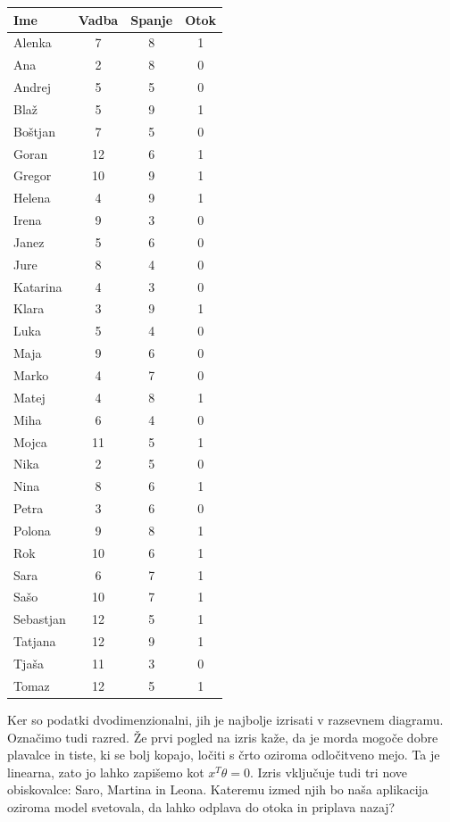 \begin{marginfigure}
\caption{Primer klasifikacijskih podatkov z meta atributum, neodvisnima spremenljivkama in razredom (Otok).}
\label{tab:bled}
\footnotesize
\centering
\begin{tabular}{lccc}
\toprule
Ime & Vadba & Spanje & Otok \\
\midrule
Alenka     & 7  & 8 & 1 \\
Ana        & 2  & 8 & 0 \\
Andrej     & 5  & 5 & 0 \\
Blaž       & 5  & 9 & 1 \\
Boštjan    & 7  & 5 & 0 \\
Goran      & 12 & 6 & 1 \\
Gregor     & 10 & 9 & 1 \\
Helena     & 4  & 9 & 1 \\
Irena      & 9  & 3 & 0 \\
Janez      & 5  & 6 & 0 \\
Jure       & 8  & 4 & 0 \\
Katarina   & 4  & 3 & 0 \\
Klara      & 3  & 9 & 1 \\
Luka       & 5  & 4 & 0 \\
Maja       & 9  & 6 & 0 \\
Marko      & 4  & 7 & 0 \\
Matej      & 4  & 8 & 1 \\
Miha       & 6  & 4 & 0 \\
Mojca      & 11 & 5 & 1 \\
Nika       & 2  & 5 & 0 \\
Nina       & 8  & 6 & 1 \\
Petra      & 3  & 6 & 0 \\
Polona     & 9  & 8 & 1 \\
Rok        & 10 & 6 & 1 \\
Sara       & 6  & 7 & 1 \\
Sašo       & 10 & 7 & 1 \\
Sebastjan  & 12 & 5 & 1 \\
Tatjana    & 12 & 9 & 1 \\
Tjaša      & 11 & 3 & 0 \\
Tomaz      & 12 & 5 & 1 \\
\bottomrule
\end{tabular}
\end{marginfigure}

Ker so podatki dvodimenzionalni, jih je najbolje izrisati v razsevnem diagramu. Označimo tudi razred. Že prvi pogled na izris kaže, da je morda mogoče dobre plavalce in tiste, ki se bolj kopajo, ločiti s črto oziroma odločitveno mejo. Ta je linearna, zato jo lahko zapišemo kot $x^T\theta = 0$. Izris vključuje tudi tri nove obiskovalce: Saro, Martina in Leona. Kateremu izmed njih bo naša aplikacija oziroma model svetovala, da lahko odplava do otoka in priplava nazaj?

